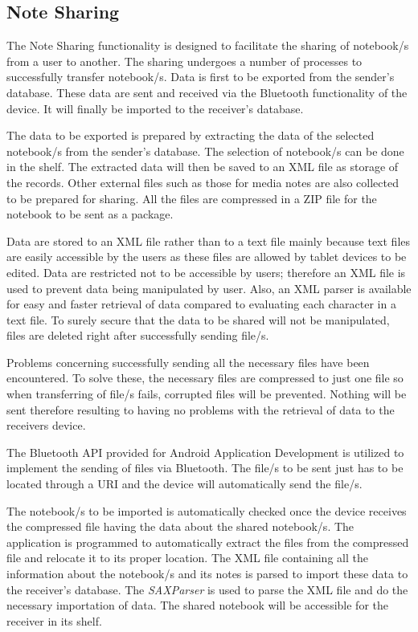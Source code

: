 \subsection{Note Sharing}
\label{sec:notesharing}

The Note Sharing functionality is designed to facilitate the sharing of notebook/s from a user to another. The sharing undergoes a number of processes to successfully transfer notebook/s. Data is first to be exported from the sender's database. These data are sent and received via the Bluetooth functionality of the device. It will finally be imported to the receiver's database.

The data to be exported is prepared by extracting the data of the selected notebook/s from the sender's database. The selection of notebook/s can be done in the shelf. The extracted data will then be saved to an XML file as storage of the records. Other external files such as those for media notes are also collected to be prepared for sharing. All the files are compressed in a ZIP file for the notebook to be sent as a package.

Data are stored to an XML file rather than to a text file mainly because text files are easily accessible by the users as these files are allowed by tablet devices to be edited. Data are restricted not to be accessible by users; therefore an XML file is used to prevent data being manipulated by user. Also, an XML parser is available for easy and faster retrieval of data compared to evaluating each character in a text file. To surely secure that the data to be shared will not be manipulated, files are deleted right after successfully sending file/s.

Problems concerning successfully sending all the necessary files have been encountered. To solve these, the necessary files are compressed to just one file so when transferring of file/s fails, corrupted files will be prevented. Nothing will be sent therefore resulting to having no problems with the retrieval of data to the receivers device.

The Bluetooth API provided for Android Application Development is utilized to implement the sending of files via Bluetooth. The file/s to be sent just has to be located through a URI and the device will automatically send the file/s.

The notebook/s to be imported is automatically checked once the device receives the compressed file having the data about the shared notebook/s. The application is programmed to automatically extract the files from the compressed file and relocate it to its proper location. The XML file containing all the information about the notebook/s and its notes is parsed to import these data to the receiver's database. The \textit{SAXParser} is used to parse the XML file and do the necessary importation of data. The shared notebook will be accessible for the receiver in its shelf.

